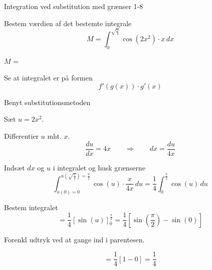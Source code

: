 \documentclass{article}
\begin{document}
\begin{exercise}{Integration ved substitution med grænser 1-8}
	
	
	Bestem værdien af det bestemte integrale
	\[
	M = \int_0^{\sqrt{\frac{\pi}{4}}} \cos(2x^2) \cdot x \, dx
	\]
	
	$M$ =  \\
	
	
	
	\hint
	
	Se at integralet er på formen
	\[
	f'(g(x)) \cdot g'(x)
	\]
	
	\hint
	
	Benyt substitutionsmetoden
	
	\hint
	
	Sæt $u=2x^2$.
	
	
	\hint
	
	Differentier $u$ mht. $x$.
	\[
	\frac{du}{dx} = 4x \qquad	\Rightarrow \qquad dx = \frac{du}{4x}
	\]
	
	\hint
	
	Indsæt $dx$ og $u$ i integralet og husk grænserne
	\[
	 \int_{u(0)=0}^{u\left(\sqrt{\frac{\pi}{4}}\right) = \frac{\pi}{2}} \cos(u) \cdot \frac{x}{4x} \, du = \frac{1}{4} \int_0^{\frac{\pi}{2}} \cos(u) \, du
	\]
	
	\hint
	
	Bestem integralet
	\[
	= \frac{1}{4} \left[ \sin(u) \right]_0^{\frac{\pi}{2}} =  \frac{1}{4} \left[ \sin\left(\frac{\pi}{2}\right) - \sin(0) \right]
	\]
	
	\hint
	Forenkl udtryk ved at gange ind i parentesen.
	
	\hint
	
	\[
	= \frac{1}{4} \left[ 1 - 0 \right] = \frac{1}{4}
	\]
	
	
\end{exercise}
\end{document}

